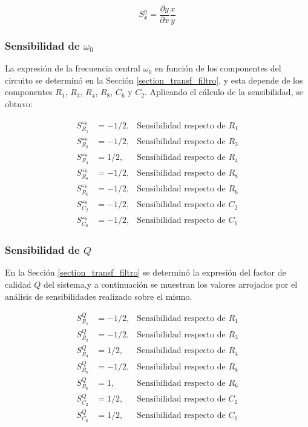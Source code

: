 \[
S_x^y = \frac{\partial y}{\partial x} \frac{x}{y}
\]

\subsubsection{Sensibilidad de $\omega_0$}
La expresión de la frecuencia central $\omega_0$ en función de los componentes del circuito se determinó en la Sección \ref{section_transf_filtro}, y esta depende de los componentes $R_1$, $R_3$, $R_4$, $R_8$, $C_6$ y $C_2$. Aplicando el cálculo de la sensibilidad, se obtuvo:

\begin{subequations}
\begin{align*}
  S_{R_1}^{\omega_0} &= -1/2, &\text{Sensibilidad respecto de }R_1 \\
  S_{R_3}^{\omega_0} &= -1/2, &\text{Sensibilidad respecto de }R_3 \\
  S_{R_4}^{\omega_0} &= 1/2, &\text{Sensibilidad respecto de }R_4 \\
  S_{R_8}^{\omega_0} &= -1/2, &\text{Sensibilidad respecto de } R_8 \\
  S_{R_6}^{\omega_0} &= -1/2, &\text{Sensibilidad respecto de } R_6 \\
  S_{C_2}^{\omega_0} &= -1/2, &\text{Sensibilidad respecto de } C_2 \\
  S_{C_6}^{\omega_0} &= -1/2, &\text{Sensibilidad respecto de } C_6
\end{align*}
\end{subequations}

\subsubsection{Sensibilidad de $Q$}
En la Sección \ref{section_transf_filtro} se determinó la expresión del factor de calidad $Q$ del sistema,y a continuación se muestran los valores arrojados por el análisis de sensibilidades realizado sobre el mismo.

\begin{subequations}
\begin{align*}
  S_{R_1}^{Q} &= -1/2, &\text{Sensibilidad respecto de }R_1 \\
  S_{R_3}^{Q} &= -1/2, &\text{Sensibilidad respecto de }R_3 \\
  S_{R_4}^{Q} &= 1/2, &\text{Sensibilidad respecto de }R_4 \\
  S_{R_8}^{Q} &= -1/2, &\text{Sensibilidad respecto de } R_8 \\
  S_{R_6}^{Q} &= 1, &\text{Sensibilidad respecto de } R_6 \\
  S_{C_2}^{Q} &= 1/2, &\text{Sensibilidad respecto de } C_2 \\
  S_{C_6}^{Q} &= 1/2, &\text{Sensibilidad respecto de } C_6
\end{align*}
\end{subequations}

